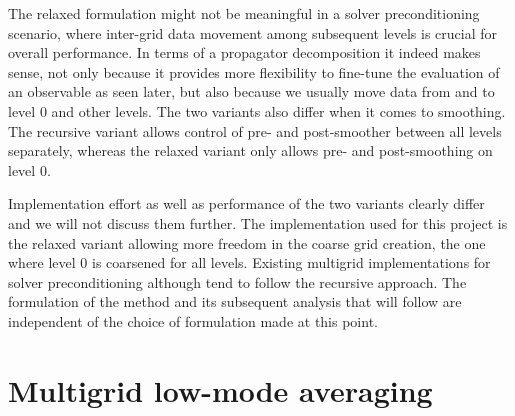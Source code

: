 The relaxed formulation might not be meaningful in a solver preconditioning scenario, where inter-grid data movement among subsequent levels is crucial for overall performance.
In terms of a propagator decomposition it indeed makes sense, not only because it provides more flexibility to fine-tune the evaluation of an observable as seen later, but also because we usually move data from and to level \num{0} and other levels.
The two variants also differ when it comes to smoothing.
The recursive variant allows control of pre- and post-smoother between all levels separately, whereas the relaxed variant only allows pre- and post-smoothing on level \num{0}.

Implementation effort as well as performance of the two variants clearly differ and we will not discuss them further.
The implementation used for this project is the relaxed variant allowing more freedom in the coarse grid creation, \ie the one where level \num{0} is coarsened for all levels.
Existing multigrid implementations for solver preconditioning although tend to follow the recursive approach.
The formulation of the method and its subsequent analysis that will follow are independent of the choice of formulation made at this point.



\section{Multigrid low-mode averaging}
\label{sec:mg:lma}


